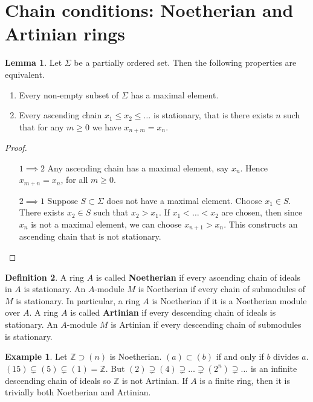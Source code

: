 \documentclass{article}
\newcommand{\Z}{\mathbb{Z}}
\newcommand{\rb}[1]{\left( #1 \right)}
\theoremstyle{definition}\newtheorem{definition}{Definition}[section]
\theoremstyle{definition}\newtheorem{remark}[definition]{Remark}
\theoremstyle{definition}\newtheorem*{example}{Example}
\theoremstyle{definition}\newtheorem*{note}{Note}
\newtheorem{lemma}[definition]{Lemma}
\begin{document}
\section{Chain conditions: Noetherian and Artinian rings}

\begin{lemma}
Let $ \Sigma $ be a partially ordered set. Then the following properties are equivalent.
\begin{enumerate}
\item Every non-empty subset of $ \Sigma $ has a maximal element.
\item Every ascending chain $ x_1 \le x_2 \le \dots $ is stationary, that is there exists $ n $ such that for any $ m \ge 0 $ we have $ x_{n + m} = x_n $.
\end{enumerate}
\end{lemma}

\begin{proof}
\hfill
\begin{itemize}[leftmargin=0.5in]
\item[$ 1 \implies 2 $] Any ascending chain has a maximal element, say $ x_n $. Hence $ x_{m + n} = x_n $, for all $ m \ge 0 $.
\item[$ 2 \implies 1 $] Suppose $ S \subset \Sigma $ does not have a maximal element. Choose $ x_1 \in S $. There exists $ x_2 \in S $ such that $ x_2 > x_1 $. If $ x_1 < \dots < x_2 $ are chosen, then since $ x_n $ is not a maximal element, we can choose $ x_{n + 1} > x_n $. This constructs an ascending chain that is not stationary.
\end{itemize}
\end{proof}

\begin{definition}
A ring $ A $ is called \textbf{Noetherian} if every ascending chain of ideals in $ A $ is stationary. An $ A $-module $ M $ is Noetherian if every chain of submodules of $ M $ is stationary. In particular, a ring $ A $ is Noetherian if it is a Noetherian module over $ A $. A ring $ A $ is called \textbf{Artinian} if every descending chain of ideals is stationary. An $ A $-module $ M $ is Artinian if every descending chain of submodules is stationary.
\end{definition}

\begin{example}
Let $ \Z \supset \rb{n} $ is Noetherian. $ \rb{a} \subset \rb{b} $ if and only if $ b $ divides $ a $. $ \rb{15} \subsetneq \rb{5} \subsetneq \rb{1} = \Z $. But $ \rb{2} \supsetneq \rb{4} \supsetneq \dots \supsetneq \rb{2^n} \supsetneq \dots $ is an infinite descending chain of ideals so $ \Z $ is not Artinian. If $ A $ is a finite ring, then it is trivially both Noetherian and Artinian.
\end{example}
\end{document}
